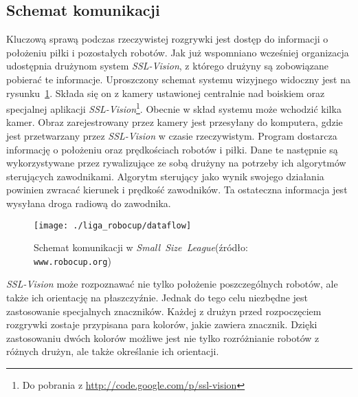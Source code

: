 	\subsection{Schemat komunikacji}
	Kluczową sprawą podczas rzeczywistej rozgrywki jest dostęp do informacji o położeniu piłki
	i pozostałych robotów. Jak już wspomniano wcześniej organizacja udostępnia drużynom system \textit{SSL-Vision}, z którego drużyny są zobowiązane pobierać te informacje. Uproszczony schemat systemu
	wizyjnego widoczny jest na rysunku~\ref{fig:comunication}.
	Składa się on z kamery ustawionej centralnie nad boiskiem oraz specjalnej aplikacji \mbox{\emph{SSL-Vision}}\footnote{ Do pobrania z \url{http://code.google.com/p/ssl-vision}}.
	Obecnie w skład systemu może wchodzić kilka kamer.
	Obraz zarejestrowany przez kamery jest przesyłany do komputera, gdzie jest przetwarzany przez \emph{SSL-Vision} w czasie rzeczywistym. Program dostarcza informację 
	o położeniu oraz prędkościach robotów i piłki. Dane te następnie są wykorzystywane przez rywalizujące ze sobą drużyny na potrzeby ich algorytmów sterujących zawodnikami.
 	Algorytm sterujący jako wynik swojego działania powinien zwracać kierunek i prędkość zawodników. Ta ostateczna informacja jest wysyłana droga radiową do zawodnika.
	\begin{figure}[H]
	\centering
	\texttt{[image: ./liga\_robocup/dataflow]}
	\caption{Schemat komunikacji w  \mbox{\emph{Small Size League}}\newline(źródło: \texttt{www.robocup.org}) }
	\label{fig:comunication}
	\end{figure} 	
	\mbox{\emph{SSL-Vision}} może rozpoznawać nie tylko położenie poszczególnych robotów, ale także ich orientację na
	płaszczyźnie. Jednak do tego celu niezbędne jest zastosowanie specjalnych znaczników. Każdej z drużyn przed rozpoczęciem rozgrywki zostaje przypisana para kolorów,
	jakie zawiera znacznik. Dzięki zastosowaniu dwóch kolorów możliwe jest nie tylko rozróżnianie robotów z różnych drużyn, ale także określanie ich orientacji.


